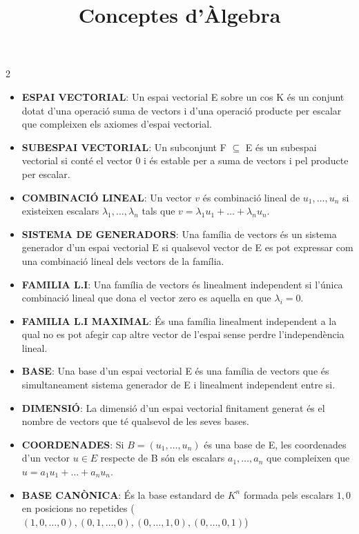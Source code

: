 \documentclass[9pt]{article}
\title{\textbf{Conceptes d'Àlgebra}}
\date{}
\begin{document}
\maketitle

\begin{tcolorbox}[
    colback=white,
    colframe=black,
    boxrule=0.8pt,
    arc=0pt
]

\begin{multicols}{2}

\begin{itemize}
    \item \textbf{ESPAI VECTORIAL}: Un espai vectorial E sobre un cos K és un conjunt dotat d'una operació suma de vectors i d'una operació producte per escalar que compleixen els axiomes d'espai vectorial.
    \item \textbf{SUBESPAI VECTORIAL}: Un subconjunt F $\subseteq$ E és un subespai vectorial si conté el vector 0 i és estable per a suma de vectors i pel producte per escalar.
    \item \textbf{COMBINACIÓ LINEAL}: Un vector $v$ és combinació lineal de $u_1, \dots, u_n$ si existeixen escalars $\lambda_1, \dots, \lambda_n$ tals que $v = \lambda_1u_1 + \dots + \lambda_nu_n$.
    \item \textbf{SISTEMA DE GENERADORS}: Una família de vectors és un sistema generador d'un espai vectorial E si qualsevol vector de E es pot expressar com una combinació lineal dels vectors de la família.
    \item \textbf{FAMILIA L.I}: Una família de vectors és linealment independent si l'única combinació lineal que dona el vector zero es aquella en que $\lambda_i = 0$.
    \item \textbf{FAMILIA L.I MAXIMAL}: És una família linealment independent a la qual no es pot afegir cap altre vector de l'espai sense perdre l'independència lineal.
    \item \textbf{BASE}: Una base d'un espai vectorial E és una família de vectors que és simultaneament sistema generador de E i linealment independent entre si.
    \item \textbf{DIMENSIÓ}: La dimensió d'un espai vectorial finitament generat és el nombre de vectors que té qualsevol de les seves bases.
    \item \textbf{COORDENADES}: Si $B = (u_1, \dots, u_n)$ és una base de E, les coordenades d'un vector $u \in E$ respecte de B són els escalars $a_1, \dots, a_n$ que compleixen que $u = a_1u_1 + \dots + a_nu_n$.
    \item \textbf{BASE CANÒNICA}: És la base estandard de $K^n$ formada pels escalars $1,0$ en posicions no repetides ($(1,0,\dots,0), (0,1,\dots,0), (0,\dots,1,0), (0,\dots,0,1)$)

\end{itemize}
\end{multicols}
\end{tcolorbox}
\end{document}
